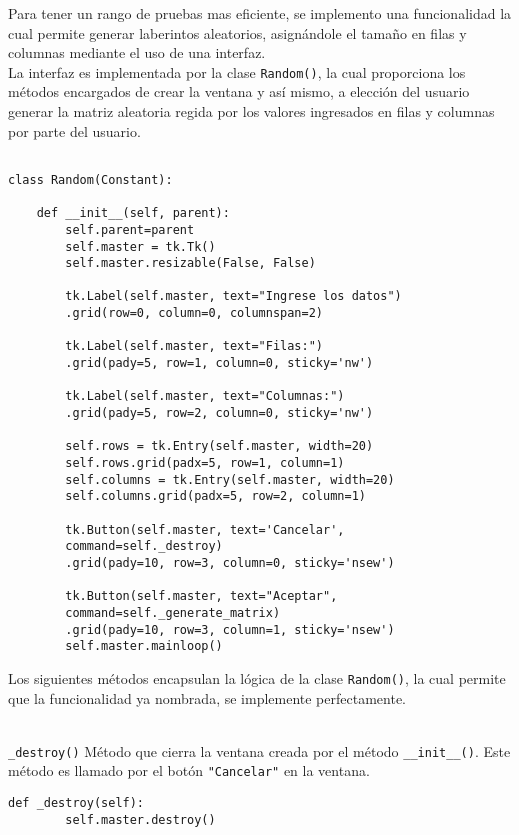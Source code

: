 Para tener un rango de pruebas mas eficiente, se implemento una funcionalidad la cual permite generar laberintos aleatorios, asignándole el tamaño en filas y columnas mediante el uso de una interfaz.
\\\newline
La interfaz es implementada por la clase \lstinline{Random()}, la cual proporciona los métodos encargados de crear la ventana y así mismo, a elección del usuario generar la matriz aleatoria regida por los valores ingresados en filas y columnas por parte del usuario. \\
\begin{lstlisting}

class Random(Constant):
    
    def __init__(self, parent):
        self.parent=parent
        self.master = tk.Tk()
        self.master.resizable(False, False)

        tk.Label(self.master, text="Ingrese los datos")
        .grid(row=0, column=0, columnspan=2)
        
        tk.Label(self.master, text="Filas:")
        .grid(pady=5, row=1, column=0, sticky='nw')
        
        tk.Label(self.master, text="Columnas:")
        .grid(pady=5, row=2, column=0, sticky='nw')

        self.rows = tk.Entry(self.master, width=20)
        self.rows.grid(padx=5, row=1, column=1)
        self.columns = tk.Entry(self.master, width=20)
        self.columns.grid(padx=5, row=2, column=1)

        tk.Button(self.master, text='Cancelar',
        command=self._destroy)
        .grid(pady=10, row=3, column=0, sticky='nsew')
   
        tk.Button(self.master, text="Aceptar",
        command=self._generate_matrix)
        .grid(pady=10, row=3, column=1, sticky='nsew')
        self.master.mainloop()
\end{lstlisting}
\clearpage 
Los siguientes métodos encapsulan la lógica de la clase \lstinline{Random()}, la cual permite que la funcionalidad ya nombrada, se implemente perfectamente.\\\

\lstinline{_destroy()} Método que cierra la ventana creada por el método \lstinline{__init__()}. Este método es llamado por el botón \lstinline{"Cancelar"} en la ventana.\\
\begin{lstlisting}
def _destroy(self):
        self.master.destroy()
\end{lstlisting}

